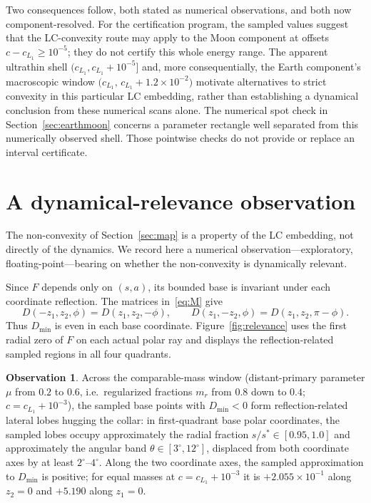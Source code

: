 \documentclass[11pt,reqno]{amsart}
\theoremstyle{plain}
\theoremstyle{definition}
\newtheorem{observation}[theorem]{Observation}
\begin{document}
Two consequences follow, both stated as numerical observations, and both now component-resolved. For the certification program, the sampled values suggest that the LC-convexity route may apply to the Moon component at offsets $c-c_{L_1}\ge10^{-5}$; they do not certify this whole energy range. The apparent ultrathin shell $\bigl(c_{L_1},c_{L_1}+10^{-5}\bigr]$ and, more consequentially, the Earth component's macroscopic window $\bigl(c_{L_1},\,c_{L_1}+1.2\times10^{-2}\bigr)$ motivate alternatives to strict convexity in this particular LC embedding, rather than establishing a dynamical conclusion from these numerical scans alone. The numerical spot check in Section~\ref{sec:earthmoon} concerns a parameter rectangle well separated from this numerically observed shell. Those pointwise checks do not provide or replace an interval certificate.

\section{A dynamical-relevance observation}\label{sec:relevance}

The non-convexity of Section~\ref{sec:map} is a property of the LC embedding, not directly of the dynamics. We record here a numerical observation---exploratory, floating-point---bearing on whether the non-convexity is dynamically relevant.

Since $F$ depends only on $(s,a)$, its bounded base is invariant under each coordinate reflection. The matrices in~\eqref{eq:M} give
\[
 D(-z_1,z_2,\phi)=D(z_1,z_2,-\phi),\qquad
 D(z_1,-z_2,\phi)=D(z_1,z_2,\pi-\phi).
\]
Thus $D_{\min}$ is even in each base coordinate. Figure~\ref{fig:relevance} uses the first radial zero of $F$ on each actual polar ray and displays the reflection-related sampled regions in all four quadrants.

\begin{observation}\label{obs:abas}
Across the comparable-mass window (distant-primary parameter $\mu$ from $0.2$ to $0.6$, i.e.\ regularized fractions $m_r$ from $0.8$ down to $0.4$; $c=c_{L_1}+10^{-3}$), the sampled base points with $D_{\min}<0$ form reflection-related lateral lobes hugging the collar: in first-quadrant base polar coordinates, the sampled lobes occupy approximately the radial fraction $s/s^\ast\in[0.95,1.0]$ and approximately the angular band $\theta\in[3^\circ,12^\circ]$, displaced from both coordinate axes by at least $2^\circ$--$4^\circ$. Along the two coordinate axes, the sampled approximation to $D_{\min}$ is positive; for equal masses at $c=c_{L_1}+10^{-3}$ it is $+2.055\times10^{-1}$ along $z_2=0$ and $+5.190$ along $z_1=0$.
\end{observation}
\end{document}
